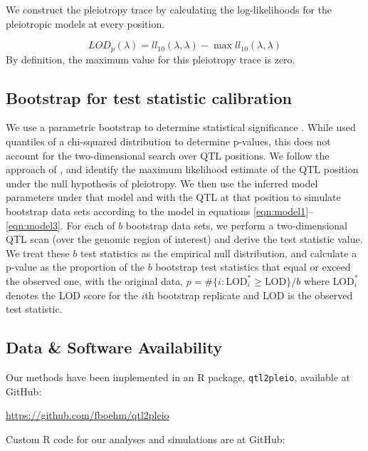 \documentclass[oneside]{book}\usepackage[]{graphicx}\usepackage[]{color}
\begin{document}
We construct the pleiotropy trace by calculating the log-likelihoods
for the pleiotropic models at every position.

\begin{equation}
LOD_{p}(\lambda) = ll_{10}(\lambda, \lambda) - \max ll_{10}(\lambda, \lambda)
\label{eq:lodp}
\end{equation}
By definition, the maximum value for this pleiotropy trace
is zero.






\subsection{Bootstrap for test statistic calibration}

We use a parametric bootstrap to determine statistical significance
\citep{efron1979}. While \citet{jiang1995multiple} used quantiles of a
chi-squared distribution to determine p-values, this does not account
for the two-dimensional search over QTL positions.
We follow the approach of \citet{tian2016dissection}, and identify
the maximum likelihood estimate of the QTL position under the null
hypothesis of pleiotropy.
We then use the inferred model parameters under that model and with
the QTL at that position to simulate bootstrap data sets according to
the model in equations \ref{eqn:model1}--\ref{eqn:model3}.
For each of $b$ bootstrap data sets, we
perform a two-dimensional QTL scan (over the genomic region of
interest) and derive the test
statistic value. We treat these $b$ test statistics as the
empirical null distribution, and calculate a p-value as the
proportion of the $b$ bootstrap test statistics that equal or exceed
the observed one, with the original data,
$p = \# \{ i:\text{LOD}^*_i \geq \text{LOD}\} / b$
where $\text{LOD}_i^*$ denotes the LOD score for the $i$th bootstrap
replicate and LOD is the observed test statistic.



\subsection{Data \& Software Availability}

Our methods have been implemented in an R package, \texttt{qtl2pleio},
available at GitHub:

\href{https://github.com/fboehm/qtl2pleio}{https://github.com/fboehm/qtl2pleio}

\noindent Custom R code for our analyses and simulations are at GitHub:
\end{document}
